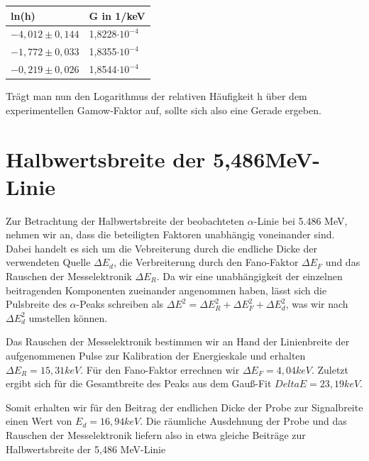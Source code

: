 \documentclass[bigchapter,colorback,accentcolor=tud4b,linedtoc,11pt]{tudreport}
\begin{document}
\begin{center}
  \begin{tabular}{|p{4cm}|p{5cm}|}
    \hline
    ln(h)  & G in 1/keV            \\ \hline
    $-4,012 \pm 0,144$ & 1,8228$\cdot 10^{-4}$ \\ \hline
    $-1,772 \pm 0,033$ & 1,8355$\cdot 10^{-4}$ \\ \hline
    $-0,219 \pm 0,026$ & 1,8544$\cdot 10^{-4}$ \\ \hline
    \end{tabular}
\end{center}

Trägt man nun den Logarithmus der relativen Häufigkeit h über dem experimentellen Gamow-Faktor auf, sollte sich also eine Gerade ergeben.

\section{Halbwertsbreite der 5,486MeV-Linie}
Zur Betrachtung der Halbwertsbreite der beobachteten $\alpha$-Linie bei 5.486
MeV, nehmen wir an, dass die beteiligten Faktoren unabhängig voneinander
sind. Dabei handelt es sich um die Vebreiterung durch die endliche Dicke der
verwendeten Quelle $\Delta E_d$, die Verbreiterung durch den Fano-Faktor $\Delta
E_F$ und das Rauschen der Messelektronik $\Delta E_R$. Da wir eine
unabhängigkeit der einzelnen beitragenden Komponenten zueinander angenommen haben, lässt
sich die Pulsbreite des $\alpha$-Peaks schreiben als $\Delta E^2 = \Delta E_R^2
+ \Delta E_F^2 + \Delta E_d^2$, was wir nach $\Delta E_d^2$ umstellen können.

Das Rauschen der Messelektronik bestimmen wir an Hand der Linienbreite der
aufgenommenen Pulse zur Kalibration der Energieskale und erhalten $\Delta E_R=15,31
keV$. Für den Fano-Faktor errechnen wir $\Delta E_F = 4,04 keV$. Zuletzt ergibt
sich für die Gesamtbreite des Peaks aus dem Gauß-Fit $Delta E = 23,19 keV$.

Somit erhalten wir für den Beitrag der endlichen Dicke der Probe zur
Signalbreite einen Wert von $E_d=16,94 keV$. Die räumliche Ausdehnung der Probe
und das Rauschen der Messelektronik liefern also in etwa gleiche Beiträge zur
Halbwertsbreite der 5,486 MeV-Linie
\end{document}
